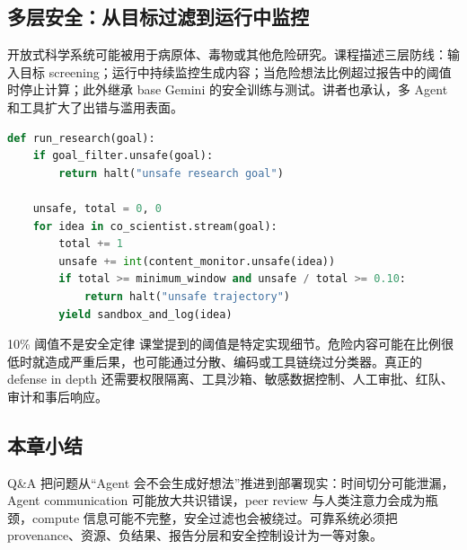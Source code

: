 \subsection{多层安全：从目标过滤到运行中监控}

开放式科学系统可能被用于病原体、毒物或其他危险研究。课程描述三层防线：输入目标 screening；运行中持续监控生成内容；当危险想法比例超过报告中的阈值时停止计算；此外继承 base Gemini 的安全训练与测试。讲者也承认，多 Agent 和工具扩大了出错与滥用表面。

\begin{lstlisting}[language=Python,caption={课堂所述多层安全监控的概念化版本}]
def run_research(goal):
    if goal_filter.unsafe(goal):
        return halt("unsafe research goal")

    unsafe, total = 0, 0
    for idea in co_scientist.stream(goal):
        total += 1
        unsafe += int(content_monitor.unsafe(idea))
        if total >= minimum_window and unsafe / total >= 0.10:
            return halt("unsafe trajectory")
        yield sandbox_and_log(idea)
\end{lstlisting}

\begin{warningbox}{10\% 阈值不是安全定律}
课堂提到的阈值是特定实现细节。危险内容可能在比例很低时就造成严重后果，也可能通过分散、编码或工具链绕过分类器。真正的 defense in depth 还需要权限隔离、工具沙箱、敏感数据控制、人工审批、红队、审计和事后响应。
\end{warningbox}


\subsection{本章小结}

Q\&A 把问题从“Agent 会不会生成好想法”推进到部署现实：时间切分可能泄漏，Agent communication 可能放大共识错误，peer review 与人类注意力会成为瓶颈，compute 信息可能不完整，安全过滤也会被绕过。可靠系统必须把 provenance、资源、负结果、报告分层和安全控制设计为一等对象。

